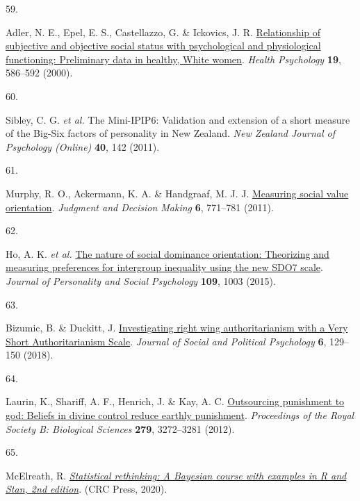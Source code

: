 \documentclass[
  man,floatsintext]{apa6}
\newlength{\cslhangindent}
\newlength{\csllabelwidth}
\newlength{\cslentryspacingunit} %
\newenvironment{CSLReferences}[2] %
 {%
  \setlength{\parindent}{0pt}
  \ifodd #1
  \let\oldpar\par
  \def\par{\hangindent=\cslhangindent\oldpar}
  \fi
  \setlength{\parskip}{#2\cslentryspacingunit}
 }%
 {}
\newcommand{\CSLLeftMargin}[1]{\parbox[t]{\csllabelwidth}{#1}}
\newcommand{\CSLRightInline}[1]{\parbox[t]{\linewidth - \csllabelwidth}{#1}\break}
\begin{document}
\begin{CSLReferences}{0}{0}
\leavevmode{}%
\CSLLeftMargin{59. }%
\CSLRightInline{Adler, N. E., Epel, E. S., Castellazzo, G. \& Ickovics, J. R. \href{https://doi.org/10.1037/0278-6133.19.6.586}{Relationship of subjective and objective social status with psychological and physiological functioning: Preliminary data in healthy, {W}hite women}. \emph{Health Psychology} \textbf{19}, 586--592 (2000).}

\leavevmode{}%
\CSLLeftMargin{60. }%
\CSLRightInline{Sibley, C. G. \emph{et al.} The {M}ini-{IPIP}6: Validation and extension of a short measure of the {B}ig-{S}ix factors of personality in {N}ew {Z}ealand. \emph{New Zealand Journal of Psychology (Online)} \textbf{40}, 142 (2011).}

\leavevmode{}%
\CSLLeftMargin{61. }%
\CSLRightInline{Murphy, R. O., Ackermann, K. A. \& Handgraaf, M. J. J. \href{https://doi.org/10.1017/S1930297500004204}{Measuring social value orientation}. \emph{Judgment and Decision Making} \textbf{6}, 771--781 (2011).}

\leavevmode{}%
\CSLLeftMargin{62. }%
\CSLRightInline{Ho, A. K. \emph{et al.} \href{https://doi.org/10.1037/pspi0000033}{The nature of social dominance orientation: Theorizing and measuring preferences for intergroup inequality using the new SDO7 scale}. \emph{Journal of Personality and Social Psychology} \textbf{109}, 1003 (2015).}

\leavevmode{}%
\CSLLeftMargin{63. }%
\CSLRightInline{Bizumic, B. \& Duckitt, J. \href{https://doi.org/10.5964/jspp.v6i1.835}{Investigating right wing authoritarianism with a {V}ery {S}hort {A}uthoritarianism {S}cale}. \emph{Journal of Social and Political Psychology} \textbf{6}, 129--150 (2018).}

\leavevmode{}%
\CSLLeftMargin{64. }%
\CSLRightInline{Laurin, K., Shariff, A. F., Henrich, J. \& Kay, A. C. \href{https://doi.org/10.1098/rspb.2012.0615}{Outsourcing punishment to god: Beliefs in divine control reduce earthly punishment}. \emph{Proceedings of the Royal Society B: Biological Sciences} \textbf{279}, 3272--3281 (2012).}

\leavevmode{}%
\CSLLeftMargin{65. }%
\CSLRightInline{McElreath, R. \emph{\href{http://xcelab.net/rm/statistical-rethinking/}{Statistical rethinking: A {Bayesian} course with examples in {R} and {Stan}, 2nd edition}}. (CRC Press, 2020).}


\end{CSLReferences}
\end{document}
